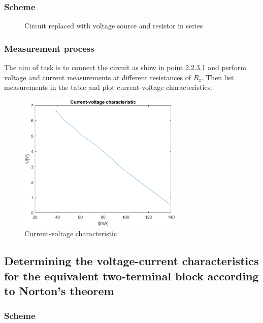 \documentclass[]{scrartcl}
\begin{document}
\subsubsection{Scheme}

\begin{figure}[H]
	\centering
	
	\caption{Circuit replaced with voltage source and resistor in series}
	\label{fig:thevenin-replaced}
\end{figure}

\subsubsection{Measurement process}

The aim of task is to connect the circuit as show in point 2.2.3.1 and perform voltage and current measurements at different resistances of $R_z$. Then list measurements in the table and plot current-voltage characteristics.



\begin{figure}[H]
	\centering
	\includegraphics[width=0.7\textwidth]{Pictures/ct_cv_char_2.png}
	\caption{Current-voltage characteristic}
	\label{fig:current-voltage-char2}
\end{figure}

\subsection{Determining the voltage-current characteristics for the equivalent two-terminal block according to Norton’s theorem}

\subsubsection{Scheme}
\end{document}
